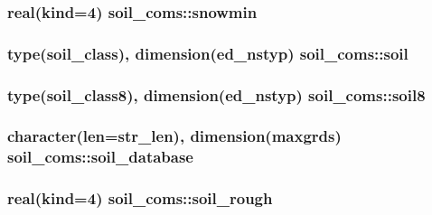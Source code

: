 \subsubsection[{\texorpdfstring{snowmin}{snowmin}}]{\setlength{\rightskip}{0pt plus 5cm}real(kind=4) soil\+\_\+coms\+::snowmin}\hypertarget{namespacesoil__coms_adad6557f24a788e2cc72fabaa3baa968}{}\label{namespacesoil__coms_adad6557f24a788e2cc72fabaa3baa968}
\subsubsection[{\texorpdfstring{soil}{soil}}]{\setlength{\rightskip}{0pt plus 5cm}type({\bf soil\+\_\+class}), dimension({\bf ed\+\_\+nstyp}) soil\+\_\+coms\+::soil}\hypertarget{namespacesoil__coms_a18bef58fe90e83fad032983a8e079a60}{}\label{namespacesoil__coms_a18bef58fe90e83fad032983a8e079a60}
\subsubsection[{\texorpdfstring{soil8}{soil8}}]{\setlength{\rightskip}{0pt plus 5cm}type({\bf soil\+\_\+class8}), dimension({\bf ed\+\_\+nstyp}) soil\+\_\+coms\+::soil8}\hypertarget{namespacesoil__coms_a5d71d43e3458fde6c6f89d29af5225c8}{}\label{namespacesoil__coms_a5d71d43e3458fde6c6f89d29af5225c8}
\subsubsection[{\texorpdfstring{soil\+\_\+database}{soil_database}}]{\setlength{\rightskip}{0pt plus 5cm}character(len=str\+\_\+len), dimension(maxgrds) soil\+\_\+coms\+::soil\+\_\+database}\hypertarget{namespacesoil__coms_a194bdfd0c85724271f3424bb0674755f}{}\label{namespacesoil__coms_a194bdfd0c85724271f3424bb0674755f}
\subsubsection[{\texorpdfstring{soil\+\_\+rough}{soil_rough}}]{\setlength{\rightskip}{0pt plus 5cm}real(kind=4) soil\+\_\+coms\+::soil\+\_\+rough}\hypertarget{namespacesoil__coms_a2bcc1e9ab626c4a0ac76283c272805c6}{}\label{namespacesoil__coms_a2bcc1e9ab626c4a0ac76283c272805c6}
